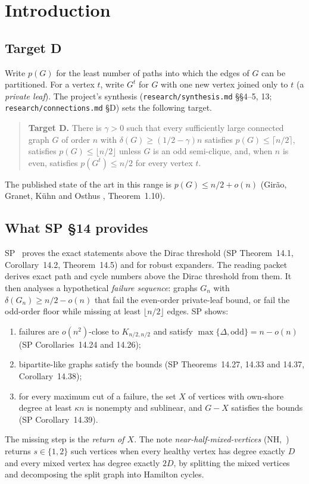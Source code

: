 \documentclass[11pt]{article}
\theoremstyle{definition}
\newcommand{\odd}{\mathrm{odd}}
\begin{document}
\tableofcontents

\section{Introduction}

\subsection{Target D}
Write $p(G)$ for the least number of paths into which the edges of $G$ can be partitioned. For a vertex $t$, write $G^t$ for $G$ with one new vertex joined only to $t$ (a \emph{private leaf}). The project's synthesis (\texttt{research/synthesis.md} \S\S4--5, 13; \texttt{research/connections.md} \S D) sets the following target.

\begin{quote}
\textbf{Target D.} There is $\gamma>0$ such that every sufficiently large connected graph $G$ of order $n$ with $\delta(G)\ge(1/2-\gamma)n$ satisfies $p(G)\le\lceil n/2\rceil$, satisfies $p(G)\le\lfloor n/2\rfloor$ unless $G$ is an odd semi-clique, and, when $n$ is even, satisfies $p(G^t)\le n/2$ for every vertex $t$.
\end{quote}

The published state of the art in this range is $p(G)\le n/2+o(n)$ (Gir\~ao, Granet, K\"uhn and Osthus \cite{GGKO}, Theorem~1.10).

\subsection{What SP \S14 provides}
SP~\cite{SP} proves the exact statements above the Dirac threshold (SP Theorem~14.1, Corollary~14.2, Theorem~14.5) and for robust expanders. The reading packet~\cite{DEC} derives exact path and cycle numbers above the Dirac threshold from them. It then analyses a hypothetical \emph{failure sequence}: graphs $G_n$ with $\delta(G_n)\ge n/2-o(n)$ that fail the even-order private-leaf bound, or fail the odd-order floor while missing at least $\lfloor n/2\rfloor$ edges. SP shows:
\begin{enumerate}[nosep]
\item failures are $o(n^2)$-close to $K_{n/2,n/2}$ and satisfy $\max\{\Delta,\odd\}=n-o(n)$ (SP Corollaries~14.24 and 14.26);
\item bipartite-like graphs satisfy the bounds (SP Theorems~14.27, 14.33 and 14.37, Corollary~14.38);
\item for every maximum cut of a failure, the set $X$ of vertices with own-shore degree at least $\kappa n$ is nonempty and sublinear, and $G-X$ satisfies the bounds (SP Corollary~14.39).
\end{enumerate}
The missing step is the \emph{return of $X$}. The note \emph{near-half-mixed-vertices} (NH,~\cite{NH}) returns $s\in\{1,2\}$ such vertices when every healthy vertex has degree exactly $D$ and every mixed vertex has degree exactly $2D$, by splitting the mixed vertices and decomposing the split graph into Hamilton cycles.
\end{document}
